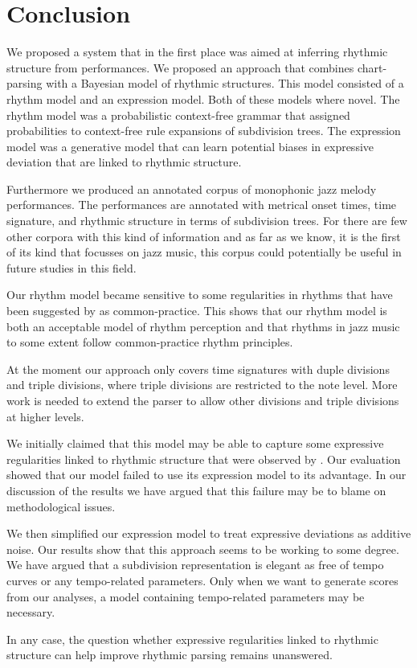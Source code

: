 \chapter{Conclusion}
\label{sec:conclusion}


We proposed a system that in the first place was aimed at inferring rhythmic structure from performances. We proposed an approach that combines chart-parsing with a Bayesian model of rhythmic structures. This model consisted of a rhythm model and an expression model. Both of these models where novel. The rhythm model was a probabilistic context-free grammar that assigned probabilities to context-free rule expansions of subdivision trees. The expression model was a generative model that can learn potential biases in expressive deviation that are linked to rhythmic structure.

Furthermore we produced an annotated corpus of monophonic jazz melody performances. The performances are annotated with metrical onset times, time signature, and rhythmic structure in terms of subdivision trees. For there are few other corpora with this kind of information and as far as we know, it is the first of its kind that focusses on jazz music, this corpus could potentially be useful in future studies in this field. 

Our rhythm model became sensitive to some regularities in rhythms that have been suggested by \citet{temperley2010modeling} as common-practice. This shows that our rhythm model is both an acceptable model of rhythm perception and that rhythms in jazz music to some extent follow common-practice rhythm principles.

At the moment our approach only covers time signatures with duple divisions and triple divisions, where triple divisions are restricted to the note level. More work is needed to extend the parser to allow other divisions and triple divisions at higher levels.

We initially claimed that this model may be able to capture some expressive regularities linked to rhythmic structure that were observed by \citet{bengtsson1983analysis}. Our evaluation showed that our model failed to use its expression model to its advantage. In our discussion of the results we have argued that this failure may be to blame on methodological issues.

We then simplified our expression model to treat expressive deviations as additive noise. Our results show that this approach seems to be working to some degree. We have argued that a subdivision representation is elegant as free of tempo curves or any tempo-related parameters. Only when we want to generate scores from our analyses, a model containing tempo-related parameters may be necessary.

In any case, the question whether expressive regularities linked to rhythmic structure can help improve rhythmic parsing remains unanswered. 

